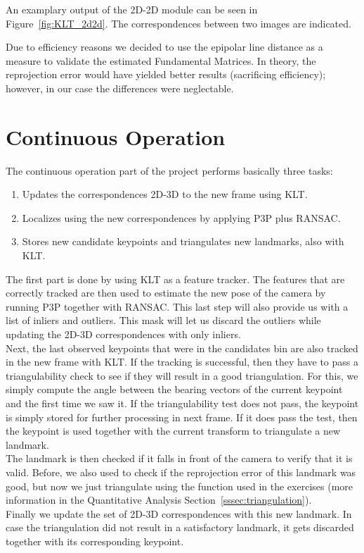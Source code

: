 An examplary output of the 2D-2D module can be seen in Figure~\ref{fig:KLT_2d2d}. The correspondences between two images are indicated.

Due to efficiency reasons we decided to use the epipolar line distance as a measure to validate the estimated Fundamental Matrices. In theory, the reprojection error would have yielded better results (sacrificing efficiency); however, in our case the differences were neglectable.

\section{Continuous Operation}
\label{s:ContOp}

The continuous operation part of the project performs basically three tasks:

\begin{enumerate}
	\item Updates the correspondences 2D-3D to the new frame using KLT.
	\item Localizes using the new correspondences by applying P3P plus RANSAC.
	\item Stores new candidate keypoints and triangulates new landmarks, also with KLT.
\end{enumerate}


The first part is done by using KLT as a feature tracker. The features that are correctly tracked are then used to estimate the new pose of the camera
by running P3P together with RANSAC. This last step will also provide us with a list of inliers and outliers.
This mask will let us discard the outliers while updating the 2D-3D correspondences with only inliers. \\
Next, the last observed keypoints that were in the candidates bin are also tracked in the new frame with KLT. If the tracking is successful, then
they have to pass a triangulability check to see if they will result in a good triangulation.
For this, we simply compute the angle between the bearing vectors of the current keypoint and the first time we saw it.
If the triangulability test does not pass, the keypoint is simply stored for further processing in next frame.
If it does pass the test, then the keypoint is used together with the current transform to triangulate a new landmark. \\
The landmark is then checked if it falls in front of the camera to verify that it is valid.
Before, we also used to check if the reprojection error of this landmark was good, but now we just triangulate using the function used in the exercises (more information in the Quantitative Analysis Section~\ref{sssec:triangulation}).\\
Finally we update the set of 2D-3D correspondences with this new landmark.
In case the triangulation did not result in a satisfactory landmark, it gets discarded together with its corresponding keypoint.

